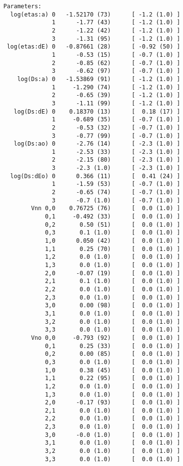 \documentclass[letterpaper,10pt,english]{sphinxmanual}
\begin{document}
\begin{Verbatim}[commandchars=\\\{\}]
Parameters:
  log(etas:a) 0   -1.52170 (73)      [ -1.2 (1.0) ]
              1      -1.77 (43)      [ -1.2 (1.0) ]
              2      -1.22 (42)      [ -1.2 (1.0) ]
              3      -1.31 (95)      [ -1.2 (1.0) ]
 log(etas:dE) 0   -0.87661 (28)      [ -0.92 (50) ]
              1      -0.53 (15)      [ -0.7 (1.0) ]
              2      -0.85 (62)      [ -0.7 (1.0) ]
              3      -0.62 (97)      [ -0.7 (1.0) ]
    log(Ds:a) 0   -1.53869 (91)      [ -1.2 (1.0) ]
              1     -1.290 (74)      [ -1.2 (1.0) ]
              2      -0.65 (39)      [ -1.2 (1.0) ]
              3      -1.11 (99)      [ -1.2 (1.0) ]
   log(Ds:dE) 0    0.18370 (13)      [  0.18 (17) ]
              1     -0.689 (35)      [ -0.7 (1.0) ]
              2      -0.53 (32)      [ -0.7 (1.0) ]
              3      -0.77 (99)      [ -0.7 (1.0) ]
   log(Ds:ao) 0      -2.76 (14)      [ -2.3 (1.0) ]
              1      -2.53 (33)      [ -2.3 (1.0) ]
              2      -2.15 (80)      [ -2.3 (1.0) ]
              3      -2.3 (1.0)      [ -2.3 (1.0) ]
  log(Ds:dEo) 0      0.366 (11)      [  0.41 (24) ]
              1      -1.59 (53)      [ -0.7 (1.0) ]
              2      -0.65 (74)      [ -0.7 (1.0) ]
              3      -0.7 (1.0)      [ -0.7 (1.0) ]
        Vnn 0,0    0.76725 (76)      [  0.0 (1.0) ]
            0,1     -0.492 (33)      [  0.0 (1.0) ]
            0,2       0.50 (51)      [  0.0 (1.0) ]
            0,3       0.1 (1.0)      [  0.0 (1.0) ]
            1,0      0.050 (42)      [  0.0 (1.0) ]
            1,1       0.25 (70)      [  0.0 (1.0) ]
            1,2       0.0 (1.0)      [  0.0 (1.0) ]
            1,3       0.0 (1.0)      [  0.0 (1.0) ]
            2,0      -0.07 (19)      [  0.0 (1.0) ]
            2,1       0.1 (1.0)      [  0.0 (1.0) ]
            2,2       0.0 (1.0)      [  0.0 (1.0) ]
            2,3       0.0 (1.0)      [  0.0 (1.0) ]
            3,0       0.00 (98)      [  0.0 (1.0) ]
            3,1       0.0 (1.0)      [  0.0 (1.0) ]
            3,2       0.0 (1.0)      [  0.0 (1.0) ]
            3,3       0.0 (1.0)      [  0.0 (1.0) ]
        Vno 0,0     -0.793 (92)      [  0.0 (1.0) ]
            0,1       0.25 (33)      [  0.0 (1.0) ]
            0,2       0.00 (85)      [  0.0 (1.0) ]
            0,3       0.0 (1.0)      [  0.0 (1.0) ]
            1,0       0.38 (45)      [  0.0 (1.0) ]
            1,1       0.22 (95)      [  0.0 (1.0) ]
            1,2       0.0 (1.0)      [  0.0 (1.0) ]
            1,3       0.0 (1.0)      [  0.0 (1.0) ]
            2,0      -0.17 (93)      [  0.0 (1.0) ]
            2,1       0.0 (1.0)      [  0.0 (1.0) ]
            2,2       0.0 (1.0)      [  0.0 (1.0) ]
            2,3       0.0 (1.0)      [  0.0 (1.0) ]
            3,0      -0.0 (1.0)      [  0.0 (1.0) ]
            3,1       0.0 (1.0)      [  0.0 (1.0) ]
            3,2       0.0 (1.0)      [  0.0 (1.0) ]
            3,3       0.0 (1.0)      [  0.0 (1.0) ]


\end{Verbatim}
\end{document}
